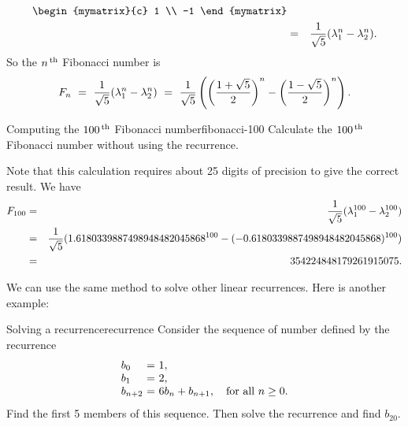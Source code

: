 \begin{solution}
\begin{eqnarray*}
        \begin{mymatrix}{c} 1 \\ -1 \end{mymatrix} \\
    &=& \frac{1}{\sqrt{5}} (\eigenvar_1^n - \eigenvar_2^n).
  \end{eqnarray*}
  So the $n^{\,\rm th}$ Fibonacci number is
  \begin{equation*}
    F_n
    ~=~ \frac{1}{\sqrt{5}} (\lambda_1^n - \lambda_2^n)
    ~=~ \frac{1}{\sqrt{5}}
    \left(\left(\frac{1+\sqrt{5}}{2}\right)^n - \left(\frac{1-\sqrt{5}}{2}\right)^n\right).
  \end{equation*}
\end{solution}

\begin{example}{Computing the $100^{\,\rm th}$ Fibonacci number}{fibonacci-100}
  Calculate the $100^{\,\rm th}$ Fibonacci number without using the recurrence.
\end{example}

\begin{solution}
  Note that this calculation requires about 25 digits of precision to
  give the correct result. We
  have
  \begin{eqnarray*}
    F_{100}
    &=& \frac{1}{\sqrt{5}} (\lambda_1^{100} - \lambda_2^{100}) \\
    &=& \frac{1}{\sqrt{5}} (1.6180339887498948482045868^{100} - (-0.6180339887498948482045868)^{100}) \\
    &=& 354224848179261915075.
  \end{eqnarray*}
\end{solution}

We can use the same method to solve other linear recurrences. Here is
another example:

\begin{example}{Solving a recurrence}{recurrence}
  Consider the sequence of number defined by the recurrence
  \begin{equation*}
    \begin{array}{l@{~}c@{~}l}
      b_0 &=& 1, \\
      b_1 &=& 2, \\
      b_{n+2} &=& 6b_{n} + b_{n+1}, \quad\mbox{for all $n\geq 0$.}\\
    \end{array}
  \end{equation*}
  Find the first 5 members of this sequence. Then solve the recurrence
  and find $b_{20}$.
\end{example}

